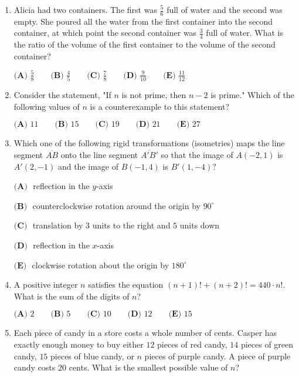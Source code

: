 \documentclass{article}
\begin{document}
\begin{enumerate}[label=\arabic*., itemsep=0.5em]
\item Alicia had two containers. The first was \(\tfrac{5}{6}\) full of water and the second was empty. She poured all the water from the first container into the second container, at which point the second container was \(\tfrac{3}{4}\) full of water. What is the ratio of the volume of the first container to the volume of the second container?

\(\textbf{(A) } \frac{5}{8} \qquad \textbf{(B) } \frac{4}{5} \qquad \textbf{(C) } \frac{7}{8} \qquad \textbf{(D) } \frac{9}{10} \qquad \textbf{(E) } \frac{11}{12}\)\par \vspace{0.5em}\item Consider the statement, "If \(n\) is not prime, then \(n-2\) is prime." Which of the following values of \(n\) is a counterexample to this statement?

\(\textbf{(A) } 11 \qquad \textbf{(B) } 15 \qquad \textbf{(C) } 19 \qquad \textbf{(D) } 21 \qquad \textbf{(E) } 27\)\par \vspace{0.5em}\item Which one of the following rigid transformations (isometries) maps the line segment \(\overline{AB}\) onto the line segment \(\overline{A'B'}\) so that the image of \(A(-2,1)\) is \(A'(2,-1)\) and the image of \(B(-1,4)\) is \(B'(1,-4)?\)

\(\textbf{(A) } \) reflection in the \(y\)-axis

\(\textbf{(B) } \) counterclockwise rotation around the origin by \(90^{\circ}\)

\(\textbf{(C) } \) translation by \(3\) units to the right and \(5\) units down

\(\textbf{(D) } \) reflection in the \(x\)-axis

\(\textbf{(E) } \) clockwise rotation about the origin by \(180^{\circ}\)\par \vspace{0.5em}\item A positive integer \(n\) satisfies the equation \((n+1)!+(n+2)!=440\cdot n!\). What is the sum of the digits of \(n\)?

\(\textbf{(A) } 2 \qquad \textbf{(B) } 5 \qquad \textbf{(C) } 10\qquad \textbf{(D) } 12 \qquad \textbf{(E) } 15\)\par \vspace{0.5em}\item Each piece of candy in a store costs a whole number of cents. Casper has exactly enough money to buy either \(12\) pieces of red candy, \(14\) pieces of green candy, \(15\) pieces of blue candy, or \(n\) pieces of purple candy. A piece of purple candy costs \(20\) cents. What is the smallest possible value of \(n\)?


\end{enumerate}
\end{document}
